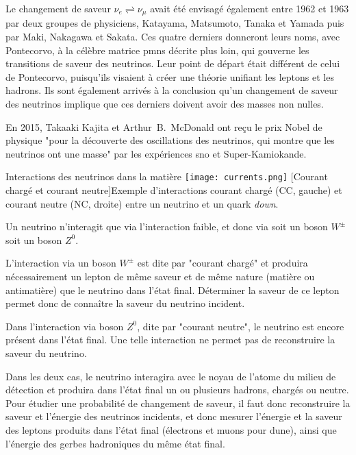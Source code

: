       Le changement de saveur $\nu_e\rightleftharpoons\nu_{\mu}$ avait été envisagé également entre 1962 et 1963 par deux groupes de physiciens, Katayama, Matsumoto, Tanaka et Yamada\cite{Nakagawa1963} puis par Maki,  Nakagawa et  Sakata\cite{Maki1962}. Ces quatre derniers donneront leurs noms, avec Pontecorvo, à la célèbre matrice \gls{pmns} décrite plus loin, qui gouverne les transitions de saveur des neutrinos. Leur point de départ était différent de celui de Pontecorvo, puisqu'ils visaient à créer une théorie unifiant les leptons et les hadrons. Ils sont également arrivés à la conclusion qu'un changement de saveur des neutrinos implique que ces derniers doivent avoir des masses non nulles.

      En 2015, Takaaki Kajita et Arthur~B.~McDonald ont reçu le prix Nobel de physique "pour la découverte des oscillations des neutrinos, qui montre que les neutrinos ont une masse" par les expériences \gls{sno} et Super-Kamiokande.

    \begin{activitybox}[label=box::courants]{Interactions des neutrinos dans la matière}
            {\centering\texttt{[image: currents.png]}
            [Courant chargé et courant neutre]{\label{fig::CC}Exemple d'interactions courant chargé (CC, gauche) et courant neutre (NC, droite) entre un neutrino et un quark \textit{down}.}}\vspace{1cm}

      Un neutrino n'interagit que via l'interaction faible, et donc via soit un boson $W^{\pm}$ soit un boson $Z^0$. 

      L'interaction via un boson $W^{\pm}$ est dite par "courant chargé" et produira nécessairement un lepton de même saveur et de même nature (matière ou antimatière) que le neutrino dans l'état final. Déterminer la saveur de ce lepton permet donc de connaître la saveur du neutrino incident.
      
      Dans l'interaction via boson $Z^0$, dite par "courant neutre", le neutrino est encore présent dans l'état final. Une telle interaction ne permet pas de reconstruire la saveur du neutrino.

      Dans les deux cas, le neutrino interagira avec le noyau de l'atome du milieu de détection et produira dans l'état final un ou plusieurs hadrons, chargés ou neutre. Pour étudier une probabilité de changement de saveur, il faut donc reconstruire la saveur et l'énergie des neutrinos incidents, et donc mesurer l'énergie et la saveur des leptons produits dans l'état final (électrons et muons pour \gls{dune}), ainsi que l'énergie des gerbes hadroniques du même état final.
    \end{activitybox}

